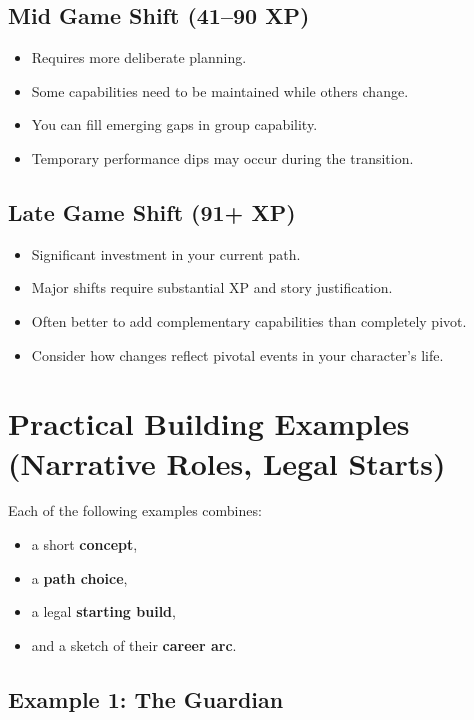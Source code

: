 \subsection*{Mid Game Shift (41--90 XP)}
\begin{itemize}
\item Requires more deliberate planning.
\item Some capabilities need to be maintained while others change.
\item You can fill emerging gaps in group capability.
\item Temporary performance dips may occur during the transition.
\end{itemize}

\subsection*{Late Game Shift (91+ XP)}
\begin{itemize}
\item Significant investment in your current path.
\item Major shifts require substantial XP and story justification.
\item Often better to add complementary capabilities than completely pivot.
\item Consider how changes reflect pivotal events in your character's life.
\end{itemize}


\section{Practical Building Examples (Narrative Roles, Legal Starts)}
\label{sec:xp-examples}

Each of the following examples combines:
\begin{itemize}
  \item a short \textbf{concept},
  \item a \textbf{path choice},
  \item a legal \textbf{starting build},
  \item and a sketch of their \textbf{career arc}.
\end{itemize}

\subsection*{Example 1: The Guardian}
\label{sec:xp-ex-guardian}

